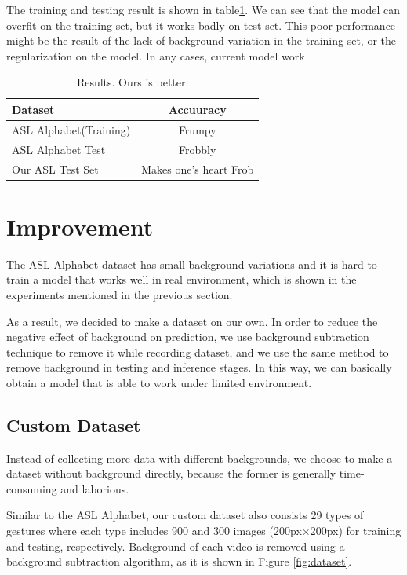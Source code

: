 \documentclass[10pt,twocolumn,letterpaper]{article}
\begin{document}
The training and testing result is shown in table\ref{table:result}. We can see   that the model can overfit on the training set, but it works badly on test set. This poor performance might be the result of the lack of background variation in the training set, or the regularization on the model. In any cases, current model work 

\begin{table}[h]
\begin{center}
\begin{tabular}{|l|c|}
\hline
Dataset & Accuuracy \\
\hline\hline
ASL Alphabet(Training) & Frumpy \\
ASL Alphabet Test & Frobbly \\
Our ASL Test Set & Makes one's heart Frob\\
\hline
\end{tabular}
\end{center}
\caption{Results.   Ours is better.}
\label{table:result}
\end{table}

\section{Improvement}

The ASL Alphabet dataset has small background variations and it is hard to train a model that works well in real environment, which is shown in the experiments mentioned in the previous section.

As a result, we decided to make a dataset on our own. In order to reduce the negative effect of background on prediction, we use background subtraction technique to remove it while recording dataset, and we use the same method to remove background in testing and inference stages. In this way, we can basically obtain a model that is able to work under limited environment.

\subsection{Custom Dataset}

Instead of collecting more data with different backgrounds, we choose to make a dataset without background directly, because the former is generally time-consuming and laborious.

Similar to the ASL Alphabet, our custom dataset also consists 29 types of gestures where each type includes 900 and 300 images (200px$\times$200px) for training and testing, respectively. Background of each video is removed using a background subtraction algorithm, as it is shown in Figure \ref{fig:dataset}.
\end{document}
